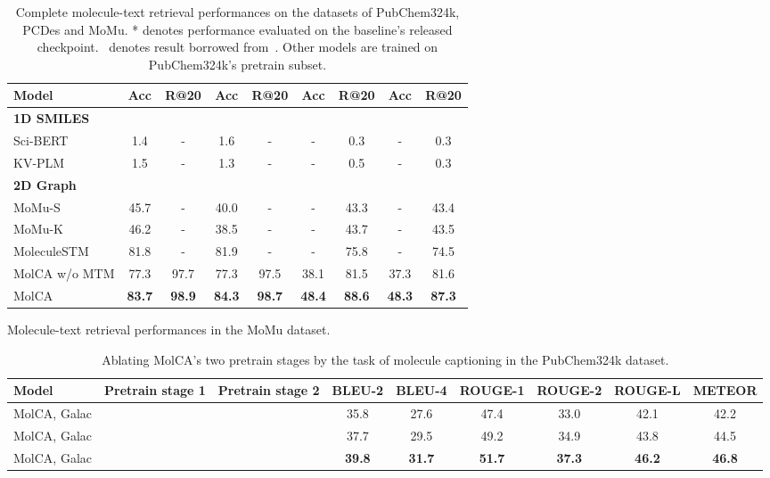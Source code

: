 \documentclass[11pt]{article}
\begin{document}
\begin{table*}[t!]
\begin{subtable}[t]{\textwidth}
\begin{tabular}{lcccccccc}
   Model & Acc & \multicolumn{1}{c}{R@20} & Acc & \multicolumn{1}{c}{R@20} & \multicolumn{1}{c}{Acc} & R@20 & \multicolumn{1}{c}{Acc} & R@20 \\\midrule
   \multicolumn{2}{l}{\textbf{1D SMILES}} & & \multicolumn{1}{l}{} & & & \multicolumn{1}{l}{} & & \multicolumn{1}{l}{} \\
   Sci-BERT & 1.4 & - & 1.6 & - & - & 0.3 & - & 0.3 \\
   KV-PLM & 1.5 & - & 1.3 & - & - & 0.5 & - & 0.3 \\\midrule
   \multicolumn{2}{l}{\textbf{2D Graph}} & & \multicolumn{1}{l}{} & & & \multicolumn{1}{l}{} & & \multicolumn{1}{l}{} \\
   MoMu-S & 45.7 & - & 40.0 & - & - & 43.3 & - & 43.4 \\
   MoMu-K & 46.2 & - & 38.5 & - & - & 43.7 & - & 43.5 \\
   MoleculeSTM & 81.8 & - & 81.9 & - & - & 75.8 & - & 74.5 \\
   MolCA w/o MTM & 77.3 & \multicolumn{1}{c}{97.7} & 77.3 & \multicolumn{1}{c}{97.5} & \multicolumn{1}{c}{38.1} & 81.5 & \multicolumn{1}{c}{37.3} & 81.6 \\
   MolCA & \textbf{83.7} & \multicolumn{1}{c}{\textbf{98.9}} & \textbf{84.3} & \multicolumn{1}{c}{\textbf{98.7}} & \multicolumn{1}{c}{\textbf{48.4}} & \textbf{88.6} & \multicolumn{1}{c}{\textbf{48.3}} & \textbf{87.3} \\\bottomrule
   \end{tabular}
   \caption{Molecule-text retrieval performances in the MoMu dataset.}
   \end{subtable}
   \caption{Complete molecule-text retrieval performances on the datasets of PubChem324k, PCDes and MoMu. * denotes performance evaluated on the baseline's released checkpoint.  ~denotes result borrowed from~\cite{MoMu}. Other models are trained on PubChem324k's pretrain subset.}
   \label{tab:full_retrieval}
   \end{table*}

   \begin{table*}[t]
    \small
    \centering
    \setlength{\tabcolsep}{3pt}
    \begin{tabular}{lcccccccc} \toprule
    Model & Pretrain stage 1 & Pretrain stage 2 & BLEU-2 & BLEU-4 & ROUGE-1 & ROUGE-2 & ROUGE-L & METEOR \\\midrule
    MolCA, Galac &  &  & 35.8 & 27.6 & 47.4 & 33.0 & 42.1 & 42.2 \\
    MolCA, Galac &  &  & 37.7 & 29.5 & 49.2 & 34.9 & 43.8 & 44.5 \\
    MolCA, Galac &  & \textbf{} & \textbf{39.8} & \textbf{31.7} & \textbf{51.7} & \textbf{37.3} & \textbf{46.2} & \textbf{46.8} \\ \bottomrule
    \end{tabular}
    \caption{Ablating MolCA's two pretrain stages by the task of molecule captioning in the PubChem324k dataset.}
    \label{tab:ablate_pretrain}
   \end{table*}
\end{document}
